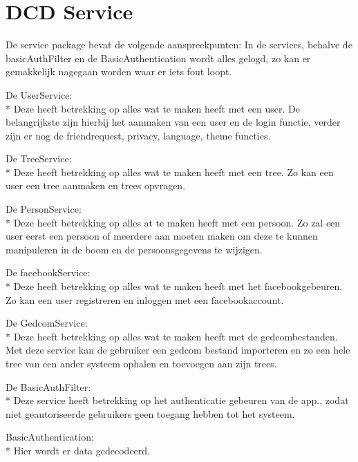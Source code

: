 \documentclass[pdftex,a4paper,12pt,twoside]{report}
\begin{document}
\section{DCD Service}
De service package bevat de volgende aanspreekpunten:
In de services, behalve de basicAuthFilter en de BasicAuthentication wordt alles gelogd, zo kan er gemakkelijk nagegaan worden waar er iets fout loopt.

De UserService:\\*
Deze heeft betrekking op alles wat te maken heeft met een user.
De belangrijkste zijn hierbij het aanmaken van een user en de login functie, verder zijn er nog de friendrequest, privacy, language, theme functies.

De TreeService:\\*
Deze heeft betrekking op alles wat te maken heeft met een tree.
Zo kan een user een tree aanmaken en trees opvragen.

De PersonService:\\*
Deze heeft betrekking op alles at te maken heeft met een persoon.
Zo zal een user eerst een persoon of meerdere aan moeten maken om deze te kunnen manipuleren in de boom en de persoonsgegevens te wijzigen.

De facebookService:\\*
Deze heeft betrekking op alles wat te maken heeft met het facebookgebeuren.
Zo kan een user registreren en inloggen met een facebookaccount.

De GedcomService:\\*
Deze heeft betrekking op alles wat te maken heeft met de gedcombestanden.
Met deze service kan de gebruiker een gedcom bestand importeren en zo een hele tree van een ander systeem ophalen en toevoegen aan zijn trees.

De BasicAuthFilter:\\*
Deze service heeft betrekking op het authenticatie gebeuren van de app., zodat niet geautoriseerde gebruikers geen toegang hebben tot het systeem.

BasicAuthentication:\\*
Hier wordt er data gedecodeerd.
\end{document}
